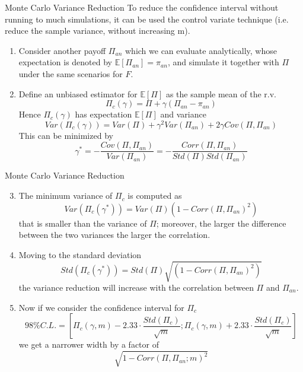 \documentclass{beamer}
\begin{document}
\begin{frame}{Monte Carlo Variance Reduction}
To reduce the confidence interval without running to much simulations, it can be used the control variate technique (i.e. reduce the sample variance, without increasing m).
\begin{enumerate}
\item Consider another payoff $\Pi_{an}$ which we can evaluate analytically, whose expectation is denoted by $\mathbb{E}[\Pi_{an}] = \pi_{an}$, and simulate it together with $\Pi$ under the same scenarios for $F$.
\item Define an unbiased estimator for $\mathbb{E}[\Pi]$ as the sample mean of the r.v. 
\begin{equation*}
\Pi_c(\gamma) = \Pi + \gamma(\Pi_{an} - \pi_{an})
\end{equation*}
Hence $\Pi_c(\gamma)$ has expectation $\mathbb{E}[\Pi]$ and variance
\begin{equation*}
Var(\Pi_c(\gamma)) = Var(\Pi) + \gamma^2 Var(\Pi_{an}) + 2\gamma Cov(\Pi, \Pi_{an})
\end{equation*}
This can be minimized by 
\begin{equation*}
\gamma^* = -\frac{Cov(\Pi, \Pi_{an})}{Var(\Pi_{an})} = -\frac{Corr(\Pi, \Pi_{an})}{Std(\Pi)Std(\Pi_{an})}
\end{equation*}
\end{enumerate}
\end{frame}

\begin{frame}{Monte Carlo Variance Reduction}
\begin{enumerate}
\setcounter{enumi}{2}
\item  The minimum variance of $\Pi_c$ is computed as
\begin{equation*}
Var(\Pi_c(\gamma^*)) = Var(\Pi) (1 - Corr(\Pi, \Pi_{an})^2)
\end{equation*}
that is smaller than the variance of $\Pi$; moreover, the larger the difference between the two variances the larger the correlation.
\item Moving to the standard deviation
\begin{equation*}
Std(\Pi_c(\gamma^*)) = Std(\Pi) \sqrt{(1 - Corr(\Pi, \Pi_{an})^2)}
\end{equation*}
the variance reduction will increase with the correlation between $\Pi$ and $\Pi_{an}$. 
\item Now if we consider the confidence interval for $\Pi_c$ 
\begin{equation*}
98\% C.L. =\left[\Pi_c(\gamma,m) - 2.33\cdot\frac{Std(\Pi_c)}{\sqrt{m}};\Pi_c(\gamma,m) + 2.33\cdot\frac{Std(\Pi_c)}{\sqrt{m}}\right] 
\end{equation*}
we get a narrower width by a factor of
\begin{equation*}
\sqrt{1 - Corr(\Pi, \Pi_{an}; m)^2}
\end{equation*}
\end{enumerate}
\end{frame}
\end{document}
